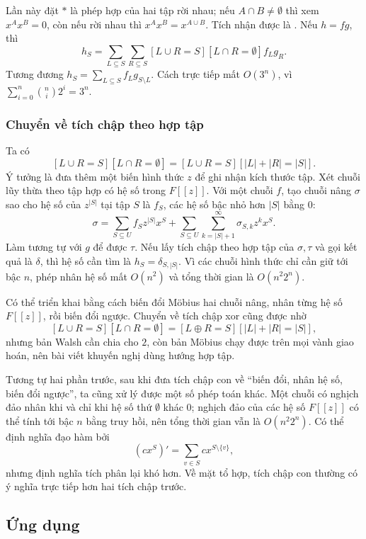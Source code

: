 \documentclass[11pt]{article}
\begin{document}
Lần này đặt \(*\) là phép hợp của hai tập rời nhau; nếu \(A\cap B\ne\emptyset\)
thì xem \(x^Ax^B=0\), còn nếu rời nhau thì \(x^Ax^B=x^{A\cup B}\). Tích nhận
được là . Nếu \(h=fg\), thì
\[
  h_S=\sum_{L\subseteq S}\sum_{R\subseteq S}
       [L\cup R=S][L\cap R=\emptyset] f_Lg_R. \tag{30}
\]
Tương đương \(h_S=\sum_{L\subseteq S}f_Lg_{S\setminus L}\). Cách trực tiếp mất
\(O(3^n)\), vì \(\sum_{i=0}^n \binom{n}{i}2^i=3^n\).

\subsubsection{Chuyển về tích chập theo hợp tập}

Ta có
\[
  [L\cup R=S][L\cap R=\emptyset]=[L\cup R=S][|L|+|R|=|S|].
\]
Ý tưởng là đưa thêm một biến hình thức \(z\) để ghi nhận kích thước tập. Xét
chuỗi lũy thừa theo tập hợp có hệ số trong \(F[[z]]\). Với một chuỗi \(f\), tạo
chuỗi nâng \(\sigma\) sao cho hệ số của \(z^{|S|}\) tại tập \(S\) là \(f_S\),
các hệ số bậc nhỏ hơn \(|S|\) bằng \(0\):
\[
  \sigma
  =
  \sum_{S\subseteq U} f_S z^{|S|}x^S
  +\sum_{S\subseteq U}\sum_{k=|S|+1}^{\infty}\sigma_{S,k}z^kx^S. \tag{31}
\]
Làm tương tự với \(g\) để được \(\tau\). Nếu lấy tích chập theo hợp tập của
\(\sigma,\tau\) và gọi kết quả là \(\delta\), thì hệ số cần tìm là
\(h_S=\delta_{S,|S|}\). Vì các chuỗi hình thức chỉ cần giữ tới bậc \(n\), phép
nhân hệ số mất \(O(n^2)\) và tổng thời gian là \(O(n^2 2^n)\).

Có thể triển khai bằng cách biến đổi Möbius hai chuỗi nâng, nhân từng hệ số
\(F[[z]]\), rồi biến đổi ngược. Chuyển về tích chập xor cũng được nhờ
\[
  [L\cup R=S][L\cap R=\emptyset]=[L\oplus R=S][|L|+|R|=|S|],
\]
nhưng bản Walsh cần chia cho \(2\), còn bản Möbius chạy được trên mọi vành giao
hoán, nên bài viết khuyến nghị dùng hướng hợp tập.

Tương tự hai phần trước, sau khi đưa tích chập con về ``biến đổi, nhân hệ số,
biến đổi ngược'', ta cũng xử lý được một số phép toán khác. Một chuỗi có nghịch
đảo nhân khi và chỉ khi hệ số thứ \(\emptyset\) khác \(0\); nghịch đảo của các
hệ số \(F[[z]]\) có thể tính tới bậc \(n\) bằng truy hồi, nên tổng thời gian
vẫn là \(O(n^2 2^n)\). Có thể định nghĩa đạo hàm bởi
\[
  (c x^S)'=\sum_{v\in S} c x^{S\setminus\{v\}},
\]
nhưng định nghĩa tích phân lại khó hơn. Về mặt tổ hợp, tích chập con thường có
ý nghĩa trực tiếp hơn hai tích chập trước.

\subsection{Ứng dụng}
\end{document}
